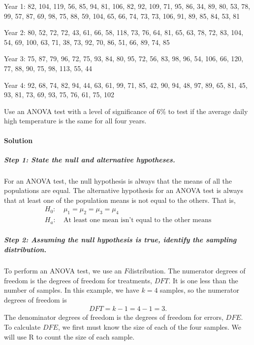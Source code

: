 \documentclass[letterpaper,10pt,english]{jupyterBook}
\begin{document}
\sphinxAtStartPar
Year 1: 
82, 104, 119, 56, 85, 94, 81, 106, 82, 92, 109, 71, 95, 86, 34, 89, 80, 53, 78, 99, 57, 87, 69, 98, 75, 88, 59, 104, 65, 66, 74, 73, 73, 106, 91, 89, 85, 84, 53, 81

\sphinxAtStartPar
Year 2: 
80, 52, 72, 72, 43, 61, 66, 58, 118, 73, 76, 64, 81, 65, 63, 78, 72, 83, 104, 54, 69, 100, 63, 71, 38, 73, 92, 70, 86, 51, 66, 89, 74, 85

\sphinxAtStartPar
Year 3: 
75, 87, 79, 96, 72, 75, 93, 84, 80, 95, 72, 56, 83, 98, 96, 54, 106, 66, 120, 77, 88, 90, 75, 98, 113, 55, 44

\sphinxAtStartPar
Year 4: 
92, 68, 74, 82, 94, 44, 63, 61, 99, 71, 85, 42, 90, 94, 48, 97, 89, 65, 81, 45, 93, 81, 73, 69, 93, 75, 76, 61, 75, 102

\sphinxAtStartPar
Use an ANOVA test with a level of significance of \(6\%\) to test if the average daily high temperature is the same for all four years.


\paragraph{Solution}
\label{\detokenize{Ch9 Hypothesis Tests of Two or More Populations/9.3 ANOVA:solution}}

\subparagraph{Step 1: State the null and alternative hypotheses.}
\label{\detokenize{Ch9 Hypothesis Tests of Two or More Populations/9.3 ANOVA:step-1-state-the-null-and-alternative-hypotheses}}
\sphinxAtStartPar
For an ANOVA test, the null hypothesis is always that the means of all the populations are equal. The alternative hypothesis for an ANOVA test is always that at least one of the population means is not equal to the others. That is,
\begin{align*}
H_0:&\ \mu_1 = \mu_2 = \mu_3 = \mu_4 \\
H_a:&\ \text{At least one mean isn't equal to the other means}
\end{align*}

\subparagraph{Step 2: Assuming the null hypothesis is true, identify the sampling distribution.}
\label{\detokenize{Ch9 Hypothesis Tests of Two or More Populations/9.3 ANOVA:step-2-assuming-the-null-hypothesis-is-true-identify-the-sampling-distribution}}
\sphinxAtStartPar
To perform an ANOVA test, we use an \(F\)\sphinxhyphen{}distribution. The numerator degrees of freedom is the degrees of freedom for treatments, \(DFT\). It is one less than the number of samples. In this example, we have \(k = 4\) samples, so the numerator degrees of freedom is
\begin{equation*}
\begin{split} DFT = k - 1 = 4 - 1 = 3. \end{split}
\end{equation*}
\sphinxAtStartPar
The denominator degrees of freedom is the degrees of freedom for errors, \(DFE\). To calculate \(DFE\), we first must know the size of each of the four samples. We will use R to count the size of each sample.
\end{document}
